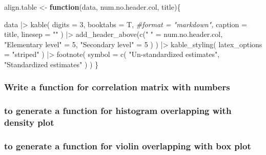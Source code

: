 \documentclass[
]{article}
\newenvironment{Shaded}{\begin{snugshade}}{\end{snugshade}}
\newcommand{\AttributeTok}[1]{\textcolor[rgb]{0.77,0.63,0.00}{#1}}
\newcommand{\CommentTok}[1]{\textcolor[rgb]{0.56,0.35,0.01}{\textit{#1}}}
\newcommand{\ControlFlowTok}[1]{\textcolor[rgb]{0.13,0.29,0.53}{\textbf{#1}}}
\newcommand{\DecValTok}[1]{\textcolor[rgb]{0.00,0.00,0.81}{#1}}
\newcommand{\FunctionTok}[1]{\textcolor[rgb]{0.00,0.00,0.00}{#1}}
\newcommand{\NormalTok}[1]{#1}
\newcommand{\OtherTok}[1]{\textcolor[rgb]{0.56,0.35,0.01}{#1}}
\newcommand{\SpecialCharTok}[1]{\textcolor[rgb]{0.00,0.00,0.00}{#1}}
\newcommand{\StringTok}[1]{\textcolor[rgb]{0.31,0.60,0.02}{#1}}
\begin{document}
\begin{Shaded}
\begin{Highlighting}[]
\NormalTok{align.table }\OtherTok{\textless{}{-}} \ControlFlowTok{function}\NormalTok{(data, num.no.header.col, title)\{}

\NormalTok{data  }\SpecialCharTok{|\textgreater{}} 
  \FunctionTok{kable}\NormalTok{(}
    \AttributeTok{digits =} \DecValTok{3}\NormalTok{,}
    \AttributeTok{booktabs =}\NormalTok{ T,}
    \CommentTok{\#format = "markdown",}
    \AttributeTok{caption =}\NormalTok{ title,}
    \AttributeTok{linesep =} \StringTok{""}
\NormalTok{    ) }\SpecialCharTok{|\textgreater{}}  
  \FunctionTok{add\_header\_above}\NormalTok{(}\FunctionTok{c}\NormalTok{(}\StringTok{" "} \OtherTok{=}\NormalTok{ num.no.header.col, }
                     \StringTok{"Elementary level"} \OtherTok{=} \DecValTok{5}\NormalTok{,}
                     \StringTok{"Secondary level"} \OtherTok{=} \DecValTok{5}
\NormalTok{                     )}
\NormalTok{                   ) }\SpecialCharTok{|\textgreater{}} 
  \FunctionTok{kable\_styling}\NormalTok{(}
    \AttributeTok{latex\_options =} \StringTok{"striped"}
\NormalTok{  ) }\SpecialCharTok{|\textgreater{}} 
  \FunctionTok{footnote}\NormalTok{(}
           \AttributeTok{symbol =} \FunctionTok{c}\NormalTok{(}
             \StringTok{"Un{-}standardized estimates"}\NormalTok{,}
             \StringTok{"Standardized estimates"}
\NormalTok{                      )}
\NormalTok{           )}
\NormalTok{\}}
\end{Highlighting}
\end{Shaded}

\hypertarget{write-a-function-for-correlation-matrix-with-numbers}{%
\subsubsection{Write a function for correlation matrix with numbers}\label{write-a-function-for-correlation-matrix-with-numbers}}

\hypertarget{to-generate-a-function-for-histogram-overlapping-with-density-plot}{%
\subsubsection{to generate a function for histogram overlapping with density plot}\label{to-generate-a-function-for-histogram-overlapping-with-density-plot}}

\hypertarget{to-generate-a-function-for-violin-overlapping-with-box-plot}{%
\subsubsection{to generate a function for violin overlapping with box plot}\label{to-generate-a-function-for-violin-overlapping-with-box-plot}}
\end{document}
